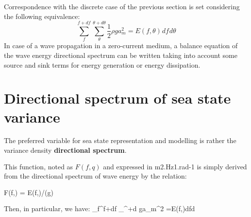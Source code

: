  Correspondence with the discrete case of the previous section is set considering the following equivalence:
\begin{equation} \label{GrindEQ__2_6_}
\sum _{f}^{f+df} \sum _{\theta }^{\theta +d\theta }\frac{1}{2} \rho ga_{m}^{2}  =E(f,\theta )_{}^{} df_{}^{} d\theta
\end{equation}
In case of a wave propagation in a zero-current medium, a balance equation of the wave energy directional spectrum can be written taking into account some source and sink terms for energy generation or energy dissipation.


\section{ Directional spectrum of sea state variance}

 The preferred variable for sea state representation and modelling is rather the variance density \textbf{directional spectrum}.

 This function, noted as $F(f,q)$ and expressed in m2.Hz1.rad-1 is simply derived from the directional spectrum of wave energy by the relation:

\bequ
\label{GrindEQ__2_7_}
F(f,\theta) = E(f,\theta)/(\rho g)  
\eequ

Then, in particular, we have: 
\bequ
\label{GrindEQ__2_8_}\sum _{f}^{f+df} \sum _{\theta }^{\theta +d\theta }  \rho ga_{m}^{2} =E(f,\theta )dfd\theta 
\eequ 


